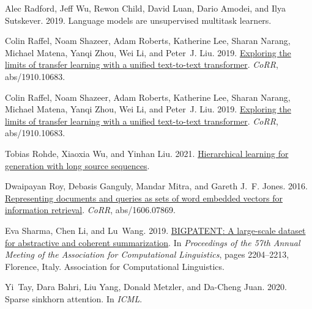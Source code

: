 \documentclass[11pt]{article}
\begin{document}
\begin{thebibliography}{43}
Alec Radford, Jeff Wu, Rewon Child, David Luan, Dario Amodei, and Ilya
  Sutskever. 2019.
\newblock Language models are unsupervised multitask learners.

Colin Raffel, Noam Shazeer, Adam Roberts, Katherine Lee, Sharan Narang, Michael
  Matena, Yanqi Zhou, Wei Li, and Peter~J. Liu. 2019{}.
\newblock \href {http://arxiv.org/abs/1910.10683} {Exploring the limits of
  transfer learning with a unified text-to-text transformer}.
\newblock \emph{CoRR}, abs/1910.10683.

Colin Raffel, Noam Shazeer, Adam Roberts, Katherine Lee, Sharan Narang, Michael
  Matena, Yanqi Zhou, Wei Li, and Peter~J. Liu. 2019{}.
\newblock \href {http://arxiv.org/abs/1910.10683} {Exploring the limits of
  transfer learning with a unified text-to-text transformer}.
\newblock \emph{CoRR}, abs/1910.10683.

Tobias Rohde, Xiaoxia Wu, and Yinhan Liu. 2021.
\newblock \href {http://arxiv.org/abs/2104.07545} {Hierarchical learning for
  generation with long source sequences}.

Dwaipayan Roy, Debasis Ganguly, Mandar Mitra, and Gareth J.~F. Jones. 2016.
\newblock \href {http://arxiv.org/abs/1606.07869} {Representing documents and
  queries as sets of word embedded vectors for information retrieval}.
\newblock \emph{CoRR}, abs/1606.07869.

Eva Sharma, Chen Li, and Lu~Wang. 2019.
\newblock \href {https://doi.org/10.18653/v1/P19-1212} {{BIGPATENT}: A
  large-scale dataset for abstractive and coherent summarization}.
\newblock In \emph{Proceedings of the 57th Annual Meeting of the Association
  for Computational Linguistics}, pages 2204--2213, Florence, Italy.
  Association for Computational Linguistics.

Yi~Tay, Dara Bahri, Liu Yang, Donald Metzler, and Da-Cheng Juan.
  2020{}.
\newblock Sparse sinkhorn attention.
\newblock In \emph{ICML}.


\end{thebibliography}
\end{document}
